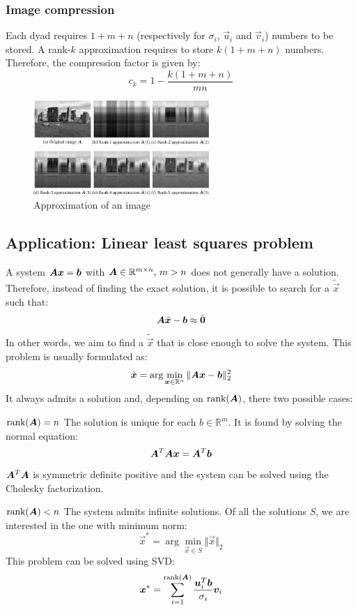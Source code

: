 \subsubsection{Image compression}
Each dyad requires $1 + m + n$ (respectively for $\sigma_i$, $\vec{u}_i$ and $\vec{v}_i$) numbers to be stored.
A rank-$k$ approximation requires to store $k(1 + m + n)$ numbers.
Therefore, the compression factor is given by: 
\[
    c_k = 1 - \frac{k(1 + m + n)}{mn}
\]

\begin{figure}[h]
    \centering
    \includegraphics[width=0.60\textwidth]{img/_rank_k_approx.pdf}
    \caption{Approximation of an image}
\end{figure}



\subsection{Application: Linear least squares problem} \label{sec:lls}
A system ${\bm{A}}{\bm{x}} = {\bm{b}}$ with ${\bm{A}} \in \mathbb{R}^{m \times n} \text{, } m > n$ 
does not generally have a solution.
Therefore, instead of finding the exact solution, it is possible to search for a $\tilde{\vec{x}}$ such that:
\[ {\bm{A}}\tilde{{\bm{x}}} - {\bm{b}} \approx \bar{{\bm{0}}} \]
In other words, we aim to find a $\tilde{\vec{x}}$ that is close enough to solve the system.
This problem is usually formulated as:
\[ 
    \tilde{{\bm{x}}} = \arg\min_{{\bm{x}} \in \mathbb{R}^n} \Vert {\bm{A}}{\bm{x}} - {\bm{b}} \Vert_2^2
\]
It always admits a solution and, depending on $\text{rank}({\bm{A}})$, there two possible cases:
\begin{descriptionlist}
    \item[$\text{rank}({\bm{A}}) = n$] 
        The solution is unique for each $b \in \mathbb{R}^m$.
        It is found by solving the normal equation:
        \[ {\bm{A}}^T{\bm{A}}{\bm{x}} = {\bm{A}}^T{\bm{b}} \]
        ${\bm{A}}^T{\bm{A}}$ is symmetric definite positive and the system can be solved using the Cholesky factorization.
    
    \item[$\text{rank}({\bm{A}}) < n$] 
        The system admits infinite solutions.
        Of all the solutions $S$, we are interested in the one with minimum norm:
        \[ \vec{x}^* = \arg\min_{\vec{x} \in S} \Vert \vec{x} \Vert_2 \]
        This problem can be solved using SVD:
        \[ {\bm{x}}^* = \sum_{i=1}^{\text{rank}({\bm{A}})} \frac{{\bm{u}}_i^T{\bm{b}}}{\sigma_i}{\bm{v}}_i \]
\end{descriptionlist}


